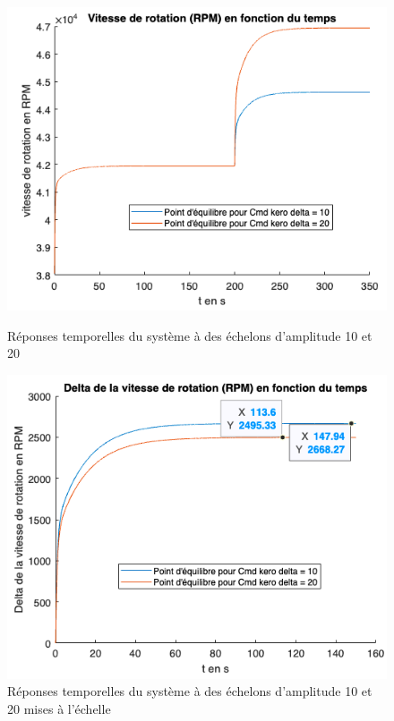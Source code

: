 \documentclass[12pt]{report}
\begin{document}
\begin{figure}[!h]
  \vspace{0.3cm}
  \centering
  \includegraphics[scale=0.55]{fig/step_response_delta10-20.png}
  \caption{Réponses temporelles du système à des échelons d'amplitude 10 et 20}
  \vspace{0.4cm}
  \includegraphics[scale=0.55]{fig/step_response_delta10-20_scaled.png}
  \caption{Réponses temporelles du système à des échelons d'amplitude 10 et 20 mises à l'échelle}
  \vspace{0.3cm}
\end{figure}
\end{document}
